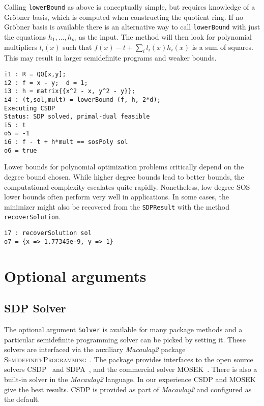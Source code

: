 \documentclass[11pt]{amsart}
\theoremstyle{plain}%
\theoremstyle{definition}
\theoremstyle{remark}
\newcommand{\Mac}{\emph{Macaulay2}\xspace}
\newcommand{\SDP}{\textsc{SemidefiniteProgramming}\xspace}
\begin{document}
Calling \verb|lowerBound| as above is conceptually simple, but requires knowledge of a Gröbner basis, which is computed when constructing the quotient ring.
If no Gröbner basis is available there is an alternative way to call \verb|lowerBound| with just the equations $h_1,\dots,h_m$ as the input.
The method will then look for polynomial multipliers $l_i(x)$ such that $f(x) - t + \sum_i l_i(x)h_i(x)$ is a sum of squares.
This may result in larger semidefinite programs and weaker bounds.

{\small
\begin{verbatim}
i1 : R = QQ[x,y];
i2 : f = x - y;  d = 1;
i3 : h = matrix{{x^2 - x, y^2 - y}};
i4 : (t,sol,mult) = lowerBound (f, h, 2*d);
Executing CSDP
Status: SDP solved, primal-dual feasible
i5 : t
o5 = -1
i6 : f - t + h*mult == sosPoly sol
o6 = true
\end{verbatim}
}

Lower bounds for polynomial optimization problems critically depend on the degree bound chosen.
While higher degree bounds lead to better bounds, the computational complexity escalates quite rapidly.
Nonetheless, low degree SOS lower bounds often perform very well in applications.
In some cases, the minimizer might also be recovered from the \verb|SDPResult| with the method \verb|recoverSolution|.

{\small
\begin{verbatim}
i7 : recoverSolution sol
o7 = {x => 1.77345e-9, y => 1}
\end{verbatim}
}

\section{Optional arguments}
\label{s:arguments}

\subsection*{SDP Solver}
The optional argument \verb|Solver| is available for many package methods and a particular semidefinite programming solver can be picked by setting it.
These solvers are interfaced via the auxiliary \Mac package \SDP~\cite{sdpM2}.
The package provides interfaces to the open source solvers CSDP~\cite{borchers1999csdp} and SDPA~\cite{yamashita2003implementation}, and the commercial solver MOSEK~\cite{mosek}.
There is also a built-in solver in the \Mac language.
In our experience CSDP and MOSEK give the best results.
CSDP is provided as part of \Mac and configured as the default.
\end{document}
